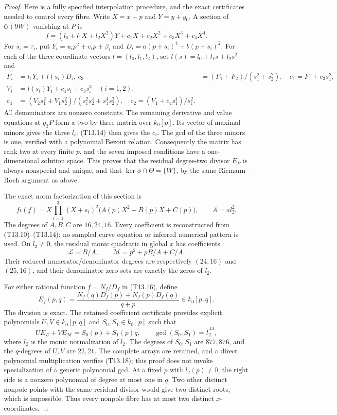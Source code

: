 \begin{proof}
Here is a fully specified interpolation procedure, and the exact
certificates needed to control every fibre. Write $X=x-p$ and
$Y=y+y_0$. A section of $\mathcal O(9W)$ vanishing at $P$ is
\[
 f=(l_0+l_1X+l_2X^2)Y+c_1X+c_2X^2+c_3X^3+c_4X^4.
\tag{T13.13}
\]
For $s_i=\tau_i$, put $Y_i=u_ip^2+v_ip+\beta_i$ and
$D_i=a(p+s_i)^4+b(p+s_i)^2$. For each of the three coordinate
vectors $l=(l_0,l_1,l_2)$, set $l(s)=l_0+l_1s+l_2s^2$ and
\[
\begin{split}
 F_i&=l_1Y_i+l(s_i)D_i,\
 c_3&=(F_1+F_2)/(s_1^2+s_2^2),\quad c_1=F_1+c_3s_1^2,\\
 V_i&=l(s_i)Y_i+c_1s_i+c_3s_i^3\quad(i=1,2),\\
 c_4&=(V_2s_1^2+V_1s_2^2)/(s_1^2s_2^4+s_1^4s_2^2),\quad
 c_2=(V_1+c_4s_1^4)/s_1^2.
\end{split}
\tag{T13.14}
\]
All denominators are nonzero constants. The remaining derivative
and value equations at $g_3P$ form a two-by-three matrix over
$k_0[p]$. Its vector of maximal minors gives the three $l_i$;
(T13.14) then gives the $c_i$. The gcd of the three minors is one,
verified with a polynomial Bezout relation. Consequently the matrix
has rank two at every finite $p$, and the seven imposed conditions
have a one-dimensional solution space. This proves that the residual
degree-two divisor $E_P$ is always nonspecial and unique, and that
$\ker\phi\cap\Theta=\{W\}$, by the same Riemann--Roch argument
as above.

The exact norm factorization of this section is
\[
 f\iota(f)=X\prod_{i=1}^3(X+s_i)^2
                 \bigl(A(p)X^2+B(p)X+C(p)\bigr),
 \qquad A=a l_2^2.
\tag{T13.15}
\]
The degrees of $A,B,C$ are $16,24,16$. Every coefficient is
reconstructed from (T13.10)--(T13.14); no sampled curve equation
or inferred numerical pattern is used. On $l_2\ne0$, the residual
monic quadratic in global $x$ has coefficients
\[
 \mathcal L=B/A,\qquad
 \mathcal M=p^2+pB/A+C/A.
\tag{T13.16}
\]
Their reduced numerator/denominator degrees are respectively
$(24,16)$ and $(25,16)$, and their denominator zero sets are
exactly the zeros of $l_2$.

For either rational function $f=N_f/D_f$ in (T13.16), define
\[
 E_f(p,q)=
 \frac{N_f(q)D_f(p)+N_f(p)D_f(q)}{q+p}\in k_0[p,q].
\tag{T13.17}
\]
The division is exact. The retained coefficient certificate provides
explicit polynomials $U,V\in k_0[p,q]$ and $S_0,S_1\in k_0[p]$
such that
\[
 UE_{\mathcal L}+VE_{\mathcal M}=S_0(p)+S_1(p)q,
 \qquad \gcd(S_0,S_1)=\overline l_2^{\,44},
\tag{T13.18}
\]
where $\overline l_2$ is the monic normalization of $l_2$.
The degrees of $S_0,S_1$ are $877,876$, and the $q$-degrees of
$U,V$ are $22,21$. The complete arrays are retained, and a direct
polynomial multiplication verifies (T13.18); this proof does not
invoke specialization of a generic polynomial gcd. At a fixed
$p$ with $l_2(p)\ne0$, the right side is a nonzero polynomial
of degree at most one in $q$. Two other distinct nonpole points
with the same residual divisor would give two distinct roots,
which is impossible. Thus every nonpole fibre has at most two
distinct $x$-coordinates.


\end{proof}
